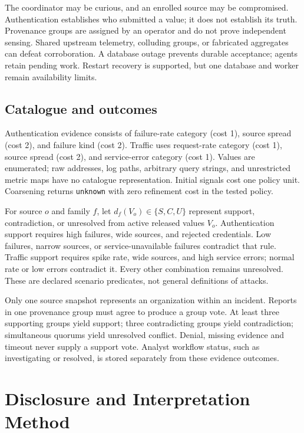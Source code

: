 \documentclass[conference,letterpaper]{IEEEtran}
\begin{document}
The coordinator may be curious, and an enrolled source may be compromised. Authentication establishes who submitted a value; it does not establish its truth. Provenance groups are assigned by an operator and do not prove independent sensing. Shared upstream telemetry, colluding groups, or fabricated aggregates can defeat corroboration. A database outage prevents durable acceptance; agents retain pending work. Restart recovery is supported, but one database and worker remain availability limits.

\subsection{Catalogue and outcomes}
Authentication evidence consists of failure-rate category (cost 1), source spread (cost 2), and failure kind (cost 2). Traffic uses request-rate category (cost 1), source spread (cost 2), and service-error category (cost 1). Values are enumerated; raw addresses, log paths, arbitrary query strings, and unrestricted metric maps have no catalogue representation. Initial signals cost one policy unit. Coarsening returns \texttt{unknown} with zero refinement cost in the tested policy.

For source $o$ and family $f$, let $d_f(V_o)\in\{S,C,U\}$ represent support, contradiction, or unresolved from active released values $V_o$. Authentication support requires high failures, wide sources, and rejected credentials. Low failures, narrow sources, or service-unavailable failures contradict that rule. Traffic support requires spike rate, wide sources, and high service errors; normal rate or low errors contradict it. Every other combination remains unresolved. These are declared scenario predicates, not general definitions of attacks.

Only one source snapshot represents an organization within an incident. Reports in one provenance group must agree to produce a group vote. At least three supporting groups yield support; three contradicting groups yield contradiction; simultaneous quorums yield unresolved conflict. Denial, missing evidence and timeout never supply a support vote. Analyst workflow status, such as investigating or resolved, is stored separately from these evidence outcomes.

\section{Disclosure and Interpretation Method}
\end{document}
